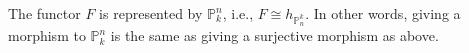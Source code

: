 The functor $F$ is represented by $\mathbb{P}^n_k$, i.e., $F\cong h_{\mathbb{P}_n^k}$. In
other words, giving a morphism to $\mathbb{P}^n_k$ is the same as giving a
surjective morphism as above.
